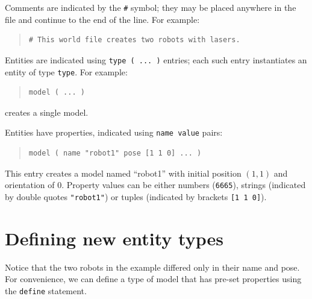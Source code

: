 \documentclass[letter,11pt,twoside]{report}
\begin{document}
Comments are indicated by the \verb'#' symbol; they may be placed
anywhere in the file and continue to the end of the line.  For
example:
\begin{quote}
\begin{verbatim}
# This world file creates two robots with lasers.
\end{verbatim}
\end{quote}
%
Entities are indicated using \verb'type ( ... )' entries; each such
entry instantiates an entity of type \verb'type'.  For example:
\begin{quote}
\begin{verbatim}
model ( ... )
\end{verbatim}
\end{quote}
creates a single model. 


Entities have properties, indicated using \verb'name value' pairs:
\begin{quote}
\begin{verbatim}
model ( name "robot1" pose [1 1 0] ... )
\end{verbatim}
\end{quote}
This entry creates a model named ``robot1'' with initial position $(1,
1)$ and orientation of $0$.  Property values can be either numbers
(\verb'6665'), strings (indicated by double quotes \verb'"robot1"') or
tuples (indicated by brackets \verb'[1 1 0]').

\section{Defining new entity types}

Notice that the two robots in the example differed only in their name
and pose. For convenience, we can define a type of model that has pre-set properties using the \verb'define' statement.
\end{document}
